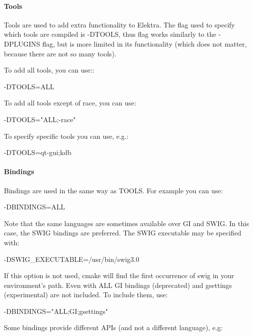 \paragraph*{Tools}

Tools are used to add extra functionality to Elektra. The flag used to specify which tools are compiled is {\ttfamily -\/\+D\+T\+O\+O\+L\+S}, thus flag works similarly to the {\ttfamily -\/\+D\+P\+L\+U\+G\+I\+N\+S} flag, but is more limited in its functionality (which does not matter, because there are not so many tools).

To add all tools, you can use\+:\+: \begin{DoxyVerb}-DTOOLS=ALL
\end{DoxyVerb}


To add all tools except of race, you can use\+: \begin{DoxyVerb}-DTOOLS="ALL;-race"
\end{DoxyVerb}


To specify specific tools you can use, e.\+g.\+: \begin{DoxyVerb}-DTOOLS=qt-gui;kdb
\end{DoxyVerb}


\paragraph*{Bindings}

Bindings are used in the same way as {\ttfamily T\+O\+O\+L\+S}. For example you can use\+: \begin{DoxyVerb}-DBINDINGS=ALL
\end{DoxyVerb}


Note that the same languages are sometimes available over G\+I and S\+W\+I\+G. In this case, the S\+W\+I\+G bindings are preferred. The S\+W\+I\+G executable may be specified with\+: \begin{DoxyVerb}-DSWIG_EXECUTABLE=/usr/bin/swig3.0
\end{DoxyVerb}


If this option is not used, cmake will find the first occurrence of {\ttfamily swig} in your environment's path. Even with {\ttfamily A\+L\+L} G\+I bindings (deprecated) and gsettings (experimental) are not included. To include them, use\+: \begin{DoxyVerb}-DBINDINGS="ALL;GI;gsettings"
\end{DoxyVerb}


Some bindings provide different A\+P\+Is (and not a different language), e.\+g\+:


